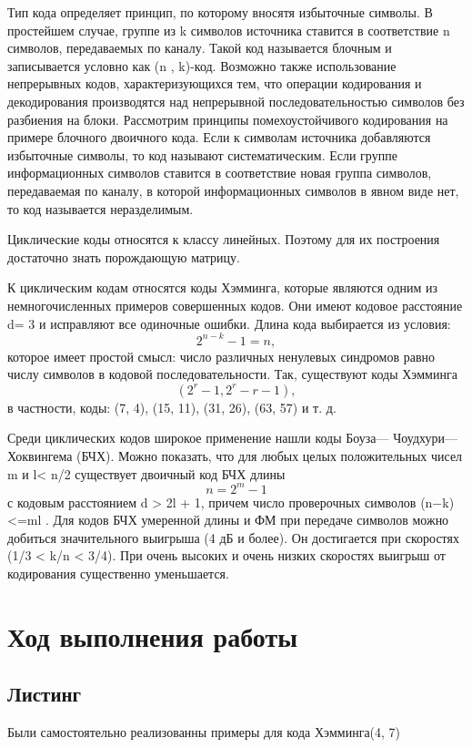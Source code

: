 Тип кода определяет принцип, по которому вносятя избыточные символы. В простейшем случае, группе из k символов источника ставится в соответствие n символов, передаваемых по каналу. Такой код называется блочным и записывается условно как (n , k)-код. Возможно также использование непрерывных кодов, характеризующихся тем, что операции кодирования и декодирования производятся над непрерывной последовательностью символов без разбиения на блоки. Рассмотрим принципы помехоустойчивого кодирования на примере блочного двоичного кода. Если к символам источника добавляются избыточные символы, то код называют систематическим. Если группе информационных символов ставится в соответствие новая группа символов, передаваемая по каналу, в которой информационных символов в явном виде нет, то код называется неразделимым.

Циклические коды относятся к классу линейных. Поэтому для их построения достаточно знать порождающую матрицу.

К циклическим кодам относятся коды Хэмминга, которые являются одним из немногочисленных примеров совершенных кодов. Они имеют кодовое расстояние d= 3 и исправляют все одиночные ошибки. Длина кода выбирается из условия: $$2^{n-k} - 1 = n,$$ которое имеет простой смысл: число различных ненулевых синдромов равно числу символов в кодовой последовательности. Так, существуют коды Хэмминга $$( 2^r - 1, 2^r - r - 1 ),$$ в частности, коды: (7, 4), (15, 11), (31, 26), (63, 57) и т. д.

Среди циклических кодов широкое применение нашли коды Боуза— Чоудхури—Хоквингема (БЧХ). Можно показать, что для любых целых положительных чисел m и l< n/2 существует двоичный код БЧХ длины 
$$n=2^m−1 $$
с кодовым расстоянием d > 2l + 1, причем число проверочных символов (n−k)<=ml
. Для кодов БЧХ умеренной длины и ФМ при передаче символов можно добиться значительного выигрыша (4 дБ и более). Он достигается при скоростях (1/3 < k/n < 3/4). При очень высоких и очень низких скоростях выигрыш от кодирования существенно уменьшается.


\section{Ход выполнения работы}

\subsection{Листинг}

Были самостоятельно реализованны примеры для кода Хэмминга(4, 7)

